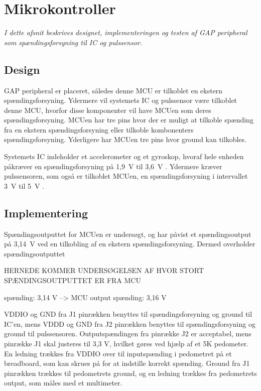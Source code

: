 \section{Mikrokontroller}
\textit{I dette afsnit beskrives designet, implementeringen og testen af GAP peripheral som spændingsforsyning til IC og pulssensor.}

\subsection{Design}
GAP peripheral er placeret, således denne MCU er tilkoblet en ekstern spændingsforsyning. Ydermere vil systemets IC og pulssensor være tilkoblet denne MCU, hvorfor disse komponenter vil have MCUen som deres spændingsforsyning. \newline
MCUen har tre pins hvor der er muligt at tilkoble spænding fra en ekstern spændingsforsyning eller tilkoble kombonenters spændingsforsyning. Yderligere har MCUen tre pins hvor ground kan tilkobles. \citep{Semiconductor2016} \newline

Systemets IC indeholder et accelerometer og et gyroskop, hvoraf hele enheden påkræver en spændingsforsyning på 1,9~V til 3,6~V \citep{Jimb02016}.
Ydermere kræver pulssensoren, som også er tilkoblet MCUen, en spændingsforsyning i intervallet 3~V til 5~V \citep{Murphy2016}.

\subsection{Implementering}
Spændingsoutputtet for MCUen er undersøgt, og har påvist et spændingsoutput på 3,14~V ved en tilkobling af en ekstern spændingsforsyning. Dermed overholder spændingsoutputtet 

HERNEDE KOMMER UNDERSØGELSEN AF HVOR STORT SPÆNDINGSOUTPUTTET ER FRA MCU

spænding: 3,14 V --> MCU output spænding: 3,16 V



VDDIO og GND fra J1 pinrækken benyttes til spændingsforsyning og ground til IC'en, mens VDDD og GND fra J2 pinrækken benyttes til spændingsforsyning og ground til pulssensoren. Outputspændingen fra pinrække J2 er acceptabel, mens pinrække J1 skal justeres til 3,3 V, hvilket gøres ved hjælp af et 5K pedometer. En ledning trækkes fra VDDIO over til inputspænding i pedometret på et breadboard, som kan skrues på for at indstille korrekt spænding. Ground fra J1 pinrækken trækkes til pedometrets ground, og en ledning trækkes fra pedometrets output, som måles med et multimeter.


